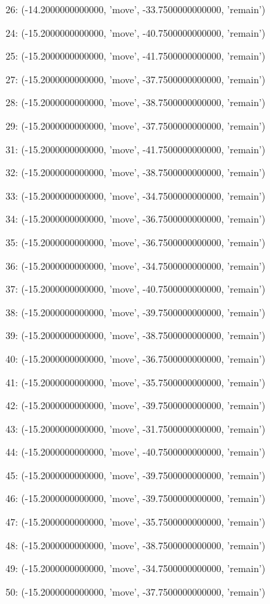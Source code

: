 26: (-14.2000000000000, 'move', -33.7500000000000, 'remain')


24: (-15.2000000000000, 'move', -40.7500000000000, 'remain')


25: (-15.2000000000000, 'move', -41.7500000000000, 'remain')


27: (-15.2000000000000, 'move', -37.7500000000000, 'remain')


28: (-15.2000000000000, 'move', -38.7500000000000, 'remain')


29: (-15.2000000000000, 'move', -37.7500000000000, 'remain')


31: (-15.2000000000000, 'move', -41.7500000000000, 'remain')


32: (-15.2000000000000, 'move', -38.7500000000000, 'remain')


33: (-15.2000000000000, 'move', -34.7500000000000, 'remain')


34: (-15.2000000000000, 'move', -36.7500000000000, 'remain')


35: (-15.2000000000000, 'move', -36.7500000000000, 'remain')


36: (-15.2000000000000, 'move', -34.7500000000000, 'remain')


37: (-15.2000000000000, 'move', -40.7500000000000, 'remain')


38: (-15.2000000000000, 'move', -39.7500000000000, 'remain')


39: (-15.2000000000000, 'move', -38.7500000000000, 'remain')


40: (-15.2000000000000, 'move', -36.7500000000000, 'remain')


41: (-15.2000000000000, 'move', -35.7500000000000, 'remain')


42: (-15.2000000000000, 'move', -39.7500000000000, 'remain')


43: (-15.2000000000000, 'move', -31.7500000000000, 'remain')


44: (-15.2000000000000, 'move', -40.7500000000000, 'remain')


45: (-15.2000000000000, 'move', -39.7500000000000, 'remain')


46: (-15.2000000000000, 'move', -39.7500000000000, 'remain')


47: (-15.2000000000000, 'move', -35.7500000000000, 'remain')


48: (-15.2000000000000, 'move', -38.7500000000000, 'remain')


49: (-15.2000000000000, 'move', -34.7500000000000, 'remain')


50: (-15.2000000000000, 'move', -37.7500000000000, 'remain')


